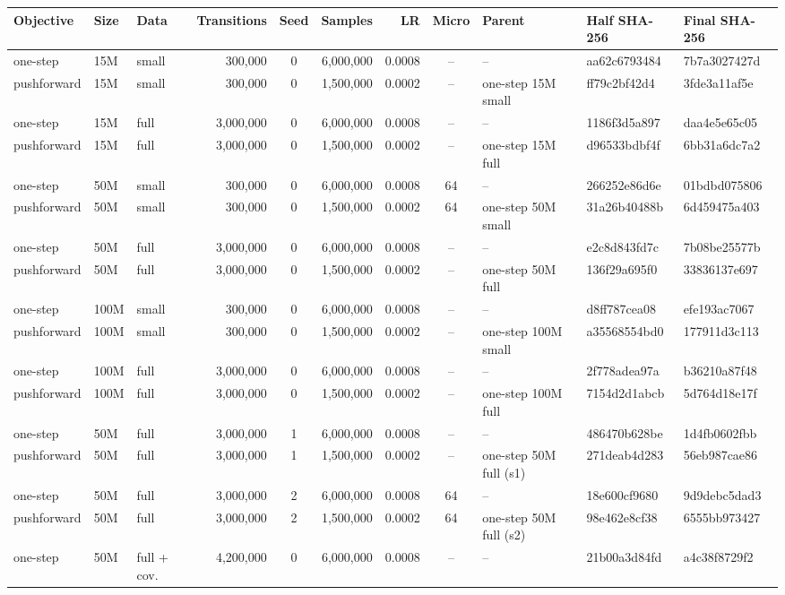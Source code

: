 \setlength{\tabcolsep}{2pt}
\begin{tabular*}{\textwidth}{@{\extracolsep{\fill}}lllrcrrclll@{}}
\toprule
Objective & Size & Data & Transitions & Seed & Samples & LR & Micro & Parent & Half SHA-256 & Final SHA-256 \\
\midrule
one-step & 15M & small & 300,000 & 0 & 6,000,000 & 0.0008 & -- & -- & aa62c6793484 & 7b7a3027427d \\
pushforward & 15M & small & 300,000 & 0 & 1,500,000 & 0.0002 & -- & one-step 15M small & ff79c2bf42d4 & 3fde3a11af5e \\
one-step & 15M & full & 3,000,000 & 0 & 6,000,000 & 0.0008 & -- & -- & 1186f3d5a897 & daa4e5e65c05 \\
pushforward & 15M & full & 3,000,000 & 0 & 1,500,000 & 0.0002 & -- & one-step 15M full & d96533bdbf4f & 6bb31a6dc7a2 \\
one-step & 50M & small & 300,000 & 0 & 6,000,000 & 0.0008 & 64 & -- & 266252e86d6e & 01bdbd075806 \\
pushforward & 50M & small & 300,000 & 0 & 1,500,000 & 0.0002 & 64 & one-step 50M small & 31a26b40488b & 6d459475a403 \\
one-step & 50M & full & 3,000,000 & 0 & 6,000,000 & 0.0008 & -- & -- & e2c8d843fd7c & 7b08be25577b \\
pushforward & 50M & full & 3,000,000 & 0 & 1,500,000 & 0.0002 & -- & one-step 50M full & 136f29a695f0 & 33836137e697 \\
one-step & 100M & small & 300,000 & 0 & 6,000,000 & 0.0008 & -- & -- & d8ff787cea08 & efe193ac7067 \\
pushforward & 100M & small & 300,000 & 0 & 1,500,000 & 0.0002 & -- & one-step 100M small & a35568554bd0 & 177911d3c113 \\
one-step & 100M & full & 3,000,000 & 0 & 6,000,000 & 0.0008 & -- & -- & 2f778adea97a & b36210a87f48 \\
pushforward & 100M & full & 3,000,000 & 0 & 1,500,000 & 0.0002 & -- & one-step 100M full & 7154d2d1abcb & 5d764d18e17f \\
one-step & 50M & full & 3,000,000 & 1 & 6,000,000 & 0.0008 & -- & -- & 486470b628be & 1d4fb0602fbb \\
pushforward & 50M & full & 3,000,000 & 1 & 1,500,000 & 0.0002 & -- & one-step 50M full (s1) & 271deab4d283 & 56eb987cae86 \\
one-step & 50M & full & 3,000,000 & 2 & 6,000,000 & 0.0008 & 64 & -- & 18e600cf9680 & 9d9debc5dad3 \\
pushforward & 50M & full & 3,000,000 & 2 & 1,500,000 & 0.0002 & 64 & one-step 50M full (s2) & 98e462e8cf38 & 6555bb973427 \\
one-step & 50M & full + cov. & 4,200,000 & 0 & 6,000,000 & 0.0008 & -- & -- & 21b00a3d84fd & a4c38f8729f2 \\
\bottomrule
\end{tabular*}
